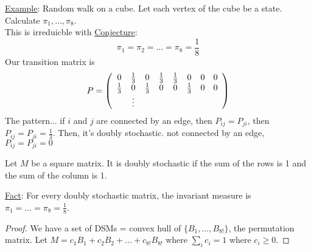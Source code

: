   \noindent\underline{Example}: Random walk on a cube. Let each vertex
  of the cube be a state.\\
  Calculate $\pi_1, \ldots, \pi_8$.\\
  This is irreduicble with
  \underline{Conjecture}: 
  $$
    \pi_1 = \pi_2 = \ldots = \pi_8 = \frac{1}{8}
  $$
  Our transition matrix is
  $$
    P = \left(\begin{array}{c c c c c c c c}
    0 & \frac{1}{3} & 0 & \frac{1}{3} & \frac{1}{3} & 0 & 0 & 0\\
    \frac{1}{3} & 0 & \frac{1}{3} & 0 &0 & \frac{1}{3} & 0 & 0 \\
    & \vdots & & & & & & \\
    \end{array}\right)
  $$
  The pattern... if $i$ and $j$ are connected by an edge, then $P_{ij} =
  P_{ji}$, then $P_{ij} = P_{ji} = \frac{1}{3}$. Then, it's doubly
  stochastic. not connected by an edge, $P_{ij} = P_{ji} = 0$\\
  \begin{definition}
    Let $M$ be a square matrix. It is doubly stochastic if the sum of
    the rows is 1 and the sum of the column is 1.
  \end{definition}
  \underline{Fact}: For every doubly stochastic matrix, the invariant measure
  is $\pi_1 = \ldots = \pi_8 = \frac{1}{8}$.\\
  \begin{proof}
    We have a set of DSMs = convex hull of $\{B_1, \ldots, B_{8!}\}$, the permutation
    matrix.
    Let $M = c_1B_1 + c_2B_2 + \ldots + c_{8!}B_{8!}$ where $\sum_i c_i = 1$ where 
    $c_i \ge 0$.
  \end{proof}
